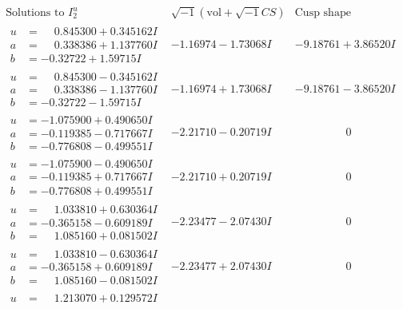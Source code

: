 \documentclass[1p]{elsarticle_modified}
\theoremstyle{definition}
\newcommand{\I}{\sqrt{-1}}
\begin{document}
$$\begin{array}{c|c|c}  
\text{Solutions to }I^u_{2}& \I (\text{vol} + \sqrt{-1}CS) & \text{Cusp shape}\\
 \hline 
\begin{aligned}
u &= \phantom{-}0.845300 + 0.345162 I \\
a &= \phantom{-}0.338386 + 1.137760 I \\
b &= -0.32722 + 1.59715 I\end{aligned}
 & -1.16974 - 1.73068 I & -9.18761 + 3.86520 I \\ \hline\begin{aligned}
u &= \phantom{-}0.845300 - 0.345162 I \\
a &= \phantom{-}0.338386 - 1.137760 I \\
b &= -0.32722 - 1.59715 I\end{aligned}
 & -1.16974 + 1.73068 I & -9.18761 - 3.86520 I \\ \hline\begin{aligned}
u &= -1.075900 + 0.490650 I \\
a &= -0.119385 - 0.717667 I \\
b &= -0.776808 - 0.499551 I\end{aligned}
 & -2.21710 - 0.20719 I & \phantom{-0.000000 } 0 \\ \hline\begin{aligned}
u &= -1.075900 - 0.490650 I \\
a &= -0.119385 + 0.717667 I \\
b &= -0.776808 + 0.499551 I\end{aligned}
 & -2.21710 + 0.20719 I & \phantom{-0.000000 } 0 \\ \hline\begin{aligned}
u &= \phantom{-}1.033810 + 0.630364 I \\
a &= -0.365158 - 0.609189 I \\
b &= \phantom{-}1.085160 + 0.081502 I\end{aligned}
 & -2.23477 - 2.07430 I & \phantom{-0.000000 } 0 \\ \hline\begin{aligned}
u &= \phantom{-}1.033810 - 0.630364 I \\
a &= -0.365158 + 0.609189 I \\
b &= \phantom{-}1.085160 - 0.081502 I\end{aligned}
 & -2.23477 + 2.07430 I & \phantom{-0.000000 } 0 \\ \hline\begin{aligned}
u &= \phantom{-}1.213070 + 0.129572 I \\

\end{aligned}
\end{array}$$
\end{document}
